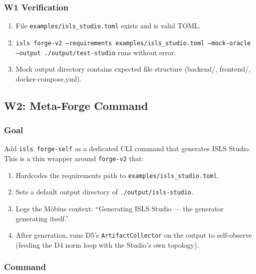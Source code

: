 \documentclass[11pt,a4paper]{article}
\begin{document}
\subsubsection{W1 Verification}

\begin{enumerate}[nosep]
\item File \texttt{examples/isls\_studio.toml} exists and is valid TOML.
\item \texttt{isls forge-v2 --requirements examples/isls\_studio.toml
      --mock-oracle --output ./output/test-studio} runs without error.
\item Mock output directory contains expected file structure
      (backend/, frontend/, docker-compose.yml).
\end{enumerate}


\subsection{W2: Meta-Forge Command}
\label{sec:w2}

\subsubsection{Goal}

Add \texttt{isls forge-self} as a dedicated CLI command that generates
ISLS Studio. This is a thin wrapper around \texttt{forge-v2} that:

\begin{enumerate}[nosep]
\item Hardcodes the requirements path to
      \texttt{examples/isls\_studio.toml}.
\item Sets a default output directory of \texttt{./output/isls-studio}.
\item Logs the M\"obius context: ``Generating ISLS Studio --- the
      generator generating itself.''
\item After generation, runs D5's \texttt{ArtifactCollector} on the
      output to self-observe (feeding the D4 norm loop with
      the Studio's own topology).
\end{enumerate}

\subsubsection{Command}
\end{document}
